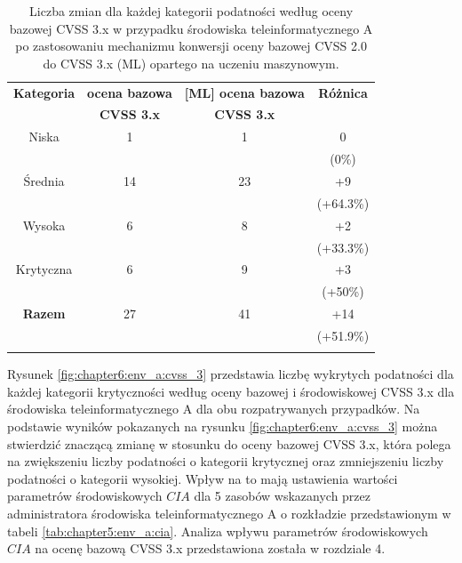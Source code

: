\begin{table}[tbh]
\caption{Liczba zmian dla każdej kategorii podatności według oceny bazowej CVSS 3.x w przypadku środowiska teleinformatycznego A po zastosowaniu mechanizmu konwersji oceny bazowej CVSS 2.0 do CVSS 3.x (ML) opartego na uczeniu maszynowym.}
\begin{center}
\label{tab:chapter6:env_a:ml_classification}
\begin{tabular}{cccc}
\hline \noalign {\smallskip}
\textbf{Kategoria}  & \textbf{ocena bazowa} & \textbf{[ML] ocena bazowa} & \textbf{Różnica} \\
                      & \textbf{CVSS 3.x} & \textbf{CVSS 3.x} & \\
  \hline
  Niska         &      1 &      1  &  0          \\
                &        &         &  (0\%)     \\
  Średnia       &     14 &      23 &  +9           \\
                &        &         &  (+64.3\%)       \\
  Wysoka        &      6 &       8 &  +2           \\
                &        &         &  (+33.3\%)   \\
  Krytyczna     &      6 &      9  &  +3          \\
                &        &         &  (+50\%)   \\
\hline \noalign {\smallskip}
\textbf{Razem}  &     27 &       41& +14 \\
                &        &         & (+51.9\%) \\
\hline \noalign {\smallskip}
\end{tabular}
\end{center}
\end{table}

\bigbreak
Rysunek \ref{fig:chapter6:env_a:cvss_3} przedstawia liczbę wykrytych podatności dla każdej kategorii krytyczności według oceny bazowej i środowiskowej CVSS 3.x dla środowiska teleinformatycznego A dla obu rozpatrywanych przypadków. Na podstawie wyników pokazanych na rysunku \ref{fig:chapter6:env_a:cvss_3} można stwierdzić znaczącą zmianę w stosunku do oceny bazowej CVSS 3.x, która polega na zwiększeniu liczby podatności o kategorii krytycznej oraz zmniejszeniu liczby podatności o kategorii wysokiej. Wpływ na to mają ustawienia wartości parametrów środowiskowych $CIA$ dla 5 zasobów wskazanych przez administratora środowiska teleinformatycznego A o rozkładzie przedstawionym w tabeli \ref{tab:chapter5:env_a:cia}. Analiza wpływu parametrów środowiskowych $CIA$ na ocenę bazową CVSS 3.x przedstawiona została w rozdziale 4.

